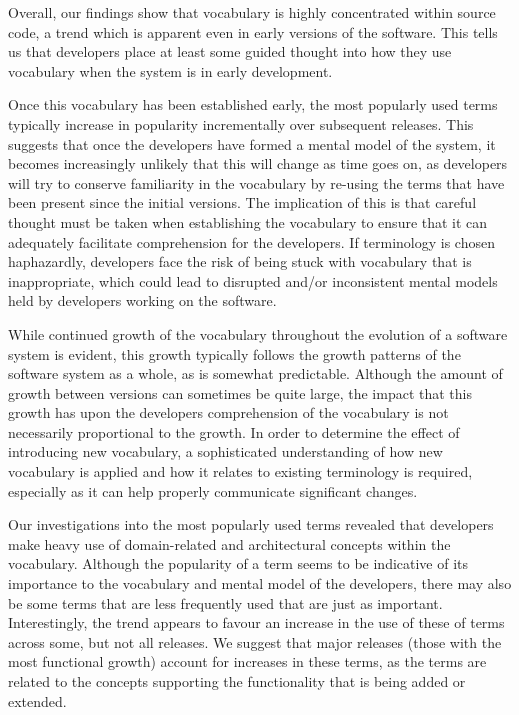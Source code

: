 Overall, our findings show that vocabulary is highly concentrated within source code, a trend which is apparent even in early versions of the software. This tells us that developers place at least some guided thought into how they use vocabulary when the system is in early development. 

Once this vocabulary has been established early, the most popularly used terms typically increase in popularity incrementally over subsequent releases. This suggests that once the developers have formed a mental model of the system, it becomes increasingly unlikely that this will change as time goes on, as developers will try to conserve familiarity in the vocabulary by re-using the terms that have been present since the initial versions. The implication of this is that careful thought must be taken when establishing the vocabulary to ensure that it can adequately facilitate comprehension for the developers. If terminology is chosen haphazardly, developers face the risk of being stuck with vocabulary that is inappropriate, which could lead to disrupted and/or inconsistent mental models held by developers working on the software.

While continued growth of the vocabulary throughout the evolution of a software system is evident, this growth typically follows the growth patterns of the software system as a whole, as is somewhat predictable. Although the amount of growth between versions can sometimes be quite large, the impact that this growth has upon the developers comprehension of the vocabulary is not necessarily proportional to the growth. In order to determine the effect of introducing new vocabulary, a sophisticated understanding of how new vocabulary is applied and how it relates to existing terminology is required, especially as it can help properly communicate significant changes.

Our investigations into the most popularly used terms revealed that developers make heavy use of domain-related and architectural concepts within the vocabulary. Although the popularity of a term seems to be indicative of its importance to the vocabulary and mental model of the developers, there may also be some terms that are less frequently used that are just as important. Interestingly, the trend appears to favour an increase in the use of these of terms across some, but not all releases. We suggest that major releases (\ie those with the most functional growth) account for increases in these terms, as the terms are related to the concepts supporting the functionality that is being added or extended.

